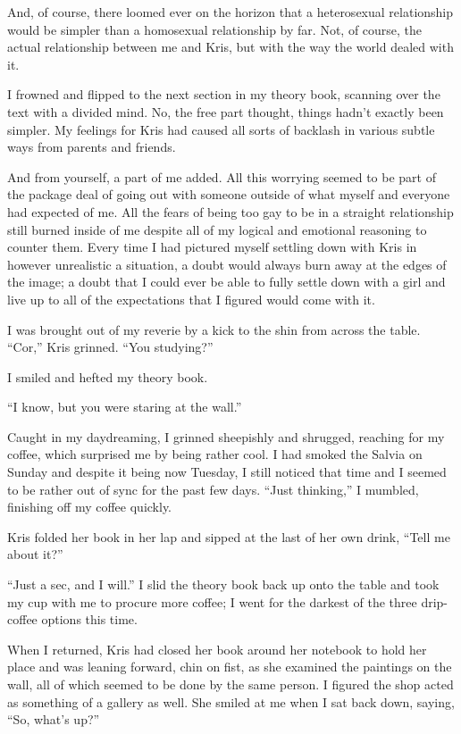And, of course, there loomed ever on the horizon that a heterosexual relationship would be simpler than a homosexual relationship by far.  Not, of course, the actual relationship between me and Kris, but with the way the world dealed with it.

I frowned and flipped to the next section in my theory book, scanning over the text with a divided mind.  No, the free part thought, things hadn't exactly been simpler.  My feelings for Kris had caused all sorts of backlash in various subtle ways from parents and friends.

And from yourself, a part of me added.  All this worrying seemed to be part of the package deal of going out with someone outside of what myself and everyone had expected of me.  All the fears of being too gay to be in a straight relationship still burned inside of me despite all of my logical and emotional reasoning to counter them.  Every time I had pictured myself settling down with Kris in however unrealistic a situation, a doubt would always burn away at the edges of the image; a doubt that I could ever be able to fully settle down with a girl and live up to all of the expectations that I figured would come with it.

I was brought out of my reverie by a kick to the shin from across the table.  ``Cor,'' Kris grinned.  ``You studying?''

I smiled and hefted my theory book.

``I know, but you were staring at the wall.''

Caught in my daydreaming, I grinned sheepishly and shrugged, reaching for my coffee, which surprised me by being rather cool.  I had smoked the Salvia on Sunday and despite it being now Tuesday, I still noticed that time and I seemed to be rather out of sync for the past few days.  ``Just thinking,'' I mumbled, finishing off my coffee quickly.

Kris folded her book in her lap and sipped at the last of her own drink, ``Tell me about it?''

``Just a sec, and I will.''  I slid the theory book back up onto the table and took my cup with me to procure more coffee; I went for the darkest of the three drip-coffee options this time.

When I returned, Kris had closed her book around her notebook to hold her place and was leaning forward, chin on fist, as she examined the paintings on the wall, all of which seemed to be done by the same person.  I figured the shop acted as something of a gallery as well.  She smiled at me when I sat back down, saying, ``So, what's up?''

